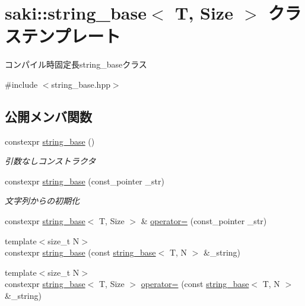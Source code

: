 \hypertarget{classsaki_1_1string__base}{}\section{saki\+:\+:string\+\_\+base$<$ T, Size $>$ クラステンプレート}
\label{classsaki_1_1string__base}


コンパイル時固定長string\+\_\+baseクラス  




{\ttfamily \#include $<$string\+\_\+base.\+hpp$>$}

\subsection*{公開メンバ関数}
\begin{DoxyCompactItemize}
\item 
constexpr \mbox{\hyperlink{classsaki_1_1string__base_a17d98d62506a1f6eb04f210498bcaba0}{string\+\_\+base}} ()
\begin{DoxyCompactList}\small\item\em 引数なしコンストラクタ \end{DoxyCompactList}\item 
constexpr \mbox{\hyperlink{classsaki_1_1string__base_add4f032c858fa8e9f93ab0ab810488d2}{string\+\_\+base}} (const\+\_\+pointer \+\_\+str)
\begin{DoxyCompactList}\small\item\em 文字列からの初期化 \end{DoxyCompactList}\item 
constexpr \mbox{\hyperlink{classsaki_1_1string__base}{string\+\_\+base}}$<$ T, Size $>$ \& \mbox{\hyperlink{classsaki_1_1string__base_ad6f67113019884abb525aa75f6c7d1a9}{operator=}} (const\+\_\+pointer \+\_\+str)
\item 
{\footnotesize template$<$size\+\_\+t N$>$ }\\constexpr \mbox{\hyperlink{classsaki_1_1string__base_af9c199307f7a24ecef3e770cd537a715}{string\+\_\+base}} (const \mbox{\hyperlink{classsaki_1_1string__base}{string\+\_\+base}}$<$ T, N $>$ \&\+\_\+string)
\item 
{\footnotesize template$<$size\+\_\+t N$>$ }\\constexpr \mbox{\hyperlink{classsaki_1_1string__base}{string\+\_\+base}}$<$ T, Size $>$ \mbox{\hyperlink{classsaki_1_1string__base_a44b85c70f7ed89e2e382861f3323f4d5}{operator=}} (const \mbox{\hyperlink{classsaki_1_1string__base}{string\+\_\+base}}$<$ T, N $>$ \&\+\_\+string)

\end{DoxyCompactItemize}
